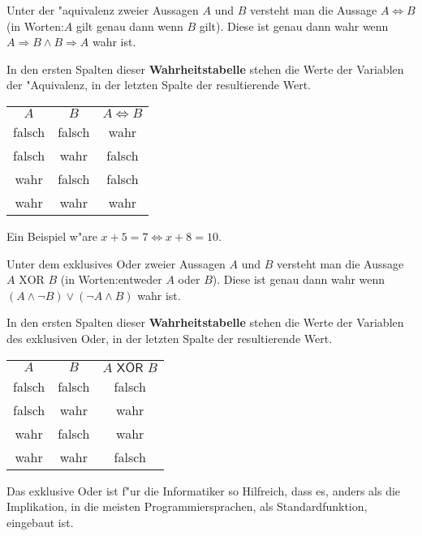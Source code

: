 \begin{definition}["Aquivalenz]
Unter der "aquivalenz zweier Aussagen $A$ und $B$ versteht man die Aussage $A \iff B$ (in Worten:\glqq $A$ gilt genau dann wenn $B$ gilt\grqq ). Diese ist genau dann wahr wenn $A \Rightarrow B \land B \Rightarrow A$ wahr ist. 
\end{definition}
In den ersten Spalten dieser \textbf{Wahrheitstabelle} stehen die Werte der Variablen der "Aquivalenz, in der letzten Spalte der resultierende Wert.
\begin{center}
\begin{tabular}{|c|c||c|}
 $A$ & $B$ & $A \iff B$  \\ 
\cellcolor{ared}falsch & \cellcolor{ared}falsch & \cellcolor{agreen}wahr    \\ 
\cellcolor{ared}falsch & \cellcolor{agreen}wahr & \cellcolor{ared}falsch    \\ 
\cellcolor{agreen}wahr & \cellcolor{ared}falsch & \cellcolor{ared}falsch    \\ 
\cellcolor{agreen}wahr & \cellcolor{agreen}wahr & \cellcolor{agreen}wahr    \\ 
\hline
\end{tabular}
\end{center}
Ein Beispiel w"are $x + 5 = 7 \iff x + 8 = 10$.


\begin{definition}
Unter dem exklusives Oder zweier Aussagen $A$ und $B$ versteht man die Aussage $A \text{ XOR } B$ (in Worten:\glqq entweder $A$ oder $B$\grqq ). Diese ist genau dann wahr wenn $(A \land \neg B) \lor (\neg A \land B)$ wahr ist. 
\end{definition}
In den ersten Spalten dieser \textbf{Wahrheitstabelle} stehen die Werte der Variablen des exklusiven Oder, in der letzten Spalte der resultierende Wert.
\begin{center}
\begin{tabular}{|c|c||c|}
$A$ & $B$ & $A \textsf{ XOR } B$  \\ 
\cellcolor{ared}falsch &  \cellcolor{ared}falsch &  \cellcolor{ared}falsch    \\ 
\cellcolor{ared}falsch & \cellcolor{agreen}wahr & \cellcolor{agreen}wahr    \\ 
\cellcolor{agreen}wahr & \cellcolor{ared}falsch & \cellcolor{agreen}wahr    \\ 
\cellcolor{agreen}wahr & \cellcolor{agreen}wahr & \cellcolor{ared}falsch    \\ 
\hline
\end{tabular}
\end{center}
Das exklusive Oder ist f"ur die Informatiker so Hilfreich, dass es, anders als die Implikation, in die meisten Programmiersprachen, als Standardfunktion, eingebaut ist.

